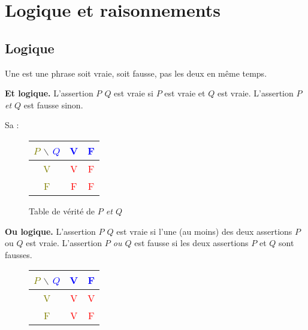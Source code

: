 \documentclass[10pt,class=article,crop=false]{standalone}
\begin{document}
\newcommand{\assertion}[1]{{\og\emph{#1}\fg}} %

\section{Logique et raisonnements}

\begin{multicols}{2}
	

\subsection{Logique}




Une  est une phrase soit vraie, soit fausse, pas les deux en même temps.

\textbf{Et logique.}
L'assertion \assertion{$P$  $Q$} est vraie si $P$ est vraie et $Q$ est vraie. L'assertion \assertion{$P$ et $Q$} est fausse sinon.

Sa  :
\begin{figure}[H]
	\centering
	\begin{tabular}{c|c|c}
		\textcolor{olive}{$P$} $\backslash$ \textcolor{blue}{$Q$} & \textcolor{blue}{V} & \textcolor{blue}{F} \\ \hline
		\textcolor{olive}{V} & \textcolor{red}{V} & \textcolor{red}{F} \\ \hline
		\textcolor{olive}{F} & \textcolor{red}{F} & \textcolor{red}{F} \\
	\end{tabular}

	{Table de vérité de \assertion{$P$ et $Q$}}
\end{figure}

\textbf{Ou logique.}
L'assertion \assertion{$P$  $Q$} est vraie si l'une (au moins) des deux assertions $P$ ou $Q$ est vraie.
L'assertion \assertion{$P$ ou $Q$} est fausse si les deux assertions $P$ et $Q$ sont fausses.

\begin{figure}[H]
	\centering
	\begin{tabular}{c|c|c}
		\textcolor{olive}{$P$} $\backslash$ \textcolor{blue}{$Q$}  & \textcolor{blue}{V} & \textcolor{blue}{F} \\ \hline
		\textcolor{olive}{V} & \textcolor{red}{V} & \textcolor{red}{V} \\ \hline
		\textcolor{olive}{F} & \textcolor{red}{V} & \textcolor{red}{F} \\
	\end{tabular}
	

\end{figure}
\end{multicols}
\end{document}
